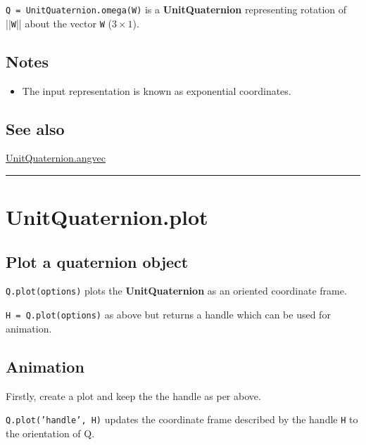 \texttt{Q = UnitQuaternion.omega(W)} is a \textbf{\color{red} UnitQuaternion} representing rotation of ||\texttt{W}|| about the vector \texttt{W} ($3 \times 1$).


\subsection*{Notes}
\begin{itemize}
  \item The input representation is known as exponential coordinates.
\end{itemize}

\subsection*{See also}


\hyperlink{UnitQuaternion.angvec}{\color{blue} UnitQuaternion.angvec}

\vspace{1.5ex}\hrule

\hypertarget{UnitQuaternion.plot}{\section*{UnitQuaternion.plot}}
\subsection*{Plot a quaternion object}


\texttt{Q.plot(options)} plots the \textbf{\color{red} UnitQuaternion} as an oriented coordinate frame.



\texttt{H = Q.plot(options)} as above but returns a handle which can be used for animation.


\subsection*{Animation}


Firstly, create a plot and keep the the handle as per above.



\texttt{Q.plot('handle', H)} updates the coordinate frame described by the handle \texttt{H} to
the orientation of Q.


